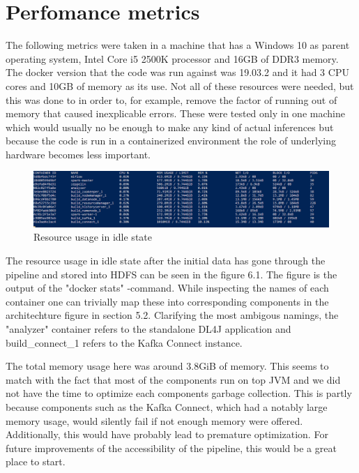 \section{Perfomance metrics}

The following metrics were taken in a machine that has a Windows 10 as parent operating system, Intel Core i5 2500K processor and 16GB of DDR3 memory.
The docker version that the code was run against was 19.03.2 and it had 3 CPU cores and 10GB of memory as its use.
Not all of these resources were needed, but this was done to in order to, for example, remove the factor of running out of memory that caused inexplicable errors.
These were tested only in one machine which would usually no be enough to make any kind of actual inferences but because the code is run in a containerized environment the role of underlying hardware becomes less important.

\begin{figure}[ht!]
    \includegraphics[scale=0.45]{images/memory1} 
    \centering
    \caption{Resource usage in idle state}
\end{figure}

The resource usage in idle state after the initial data has gone through the pipeline and stored into HDFS can be seen in the figure 6.1.
The figure is the output of the "docker stats" -command.
While inspecting the names of each container one can trivially map these into corresponding components in the architechture figure in section 5.2.
Clarifying the most ambigous namings, the "analyzer" container refers to the standalone DL4J application and build\_connect\_1 refers to the Kafka Connect instance.

The total memory usage here was around 3.8GiB of memory.
This seems to match with the fact that most of the components run on top JVM and we did not have the time to optimize each components garbage collection. 
This is partly because components such as the Kafka Connect, which had a notably large memory usage, would silently fail if not enough memory were offered.
Additionally, this would have probably lead to premature optimization.
For future improvements of the accessibility of the pipeline, this would be a great place to start.

